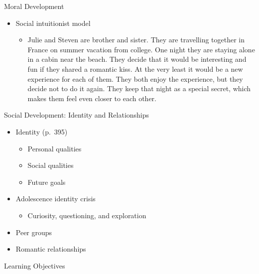 \documentclass[
]{book}
\providecommand{\tightlist}{%
  \setlength{\itemsep}{0pt}\setlength{\parskip}{0pt}}
\begin{document}
\begin{reflect}
Moral Development

\begin{itemize}
\tightlist
\item
  Social intuitionist model

  \begin{itemize}
  \tightlist
  \item
    Julie and Steven are brother and sister. They are travelling together in France on summer vacation from college. One night they are staying alone in a cabin near the beach. They decide that it would be interesting and fun if they shared a romantic kiss. At the very least it would be a new experience for each of them. They both enjoy the experience, but they decide not to do it again. They keep that night as a special secret, which makes them feel even closer to each other.
  \end{itemize}
\end{itemize}

Social Development: Identity and Relationships

\begin{itemize}
\tightlist
\item
  Identity (p.~395)

  \begin{itemize}
  \tightlist
  \item
    Personal qualities\\
  \item
    Social qualities\\
  \item
    Future goals\\
  \end{itemize}
\item
  Adolescence identity crisis

  \begin{itemize}
  \tightlist
  \item
    Curiosity, questioning, and exploration\\
  \end{itemize}
\item
  Peer groups\\
\item
  Romantic relationships
\end{itemize}

Learning Objectives


\end{reflect}
\end{document}
